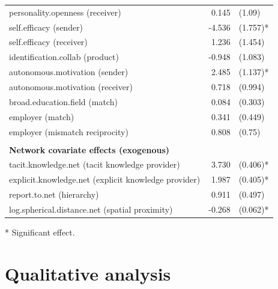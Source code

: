 \begin{table}[]
\begin{threeparttable}
\begin{tabular}{@{}lrl@{}}
		personality.openness (receiver)                      & 0.145          & (1.09)           \\
		self.efficacy (sender)                               & -4.536         & (1.757)*         \\
		self.efficacy (receiver)                             & 1.236          & (1.454)          \\
		identification.collab (product)                      & -0.948         & (1.083)          \\
		autonomous.motivation (sender)                       & 2.485          & (1.137)*         \\
		autonomous.motivation (receiver)                     & 0.718          & (0.994)          \\
		broad.education.field (match)                        & 0.084          & (0.303)          \\
		employer (match)                                     & 0.341          & (0.449)          \\
		employer (mismatch reciprocity)                      & 0.808          & (0.75)           \\
		&                &                  \\
		\textbf{Network covariate effects (exogenous)}       &                &                  \\
		tacit.knowledge.net (tacit knowledge provider)       & 3.730          & (0.406)*         \\
		explicit.knowledge.net (explicit knowledge provider) & 1.987          & (0.405)*         \\
		report.to.net (hierarchy)                            & 0.911          & (0.497)          \\
		log.spherical.distance.net (spatial proximity)       & -0.268         & (0.062)*         \\ \bottomrule
		\end{tabular}
		\begin{tablenotes}
			\small
			\item [*] Significant effect.
		\end{tablenotes}
	\end{threeparttable}
\end{table}


\section{Qualitative analysis}

